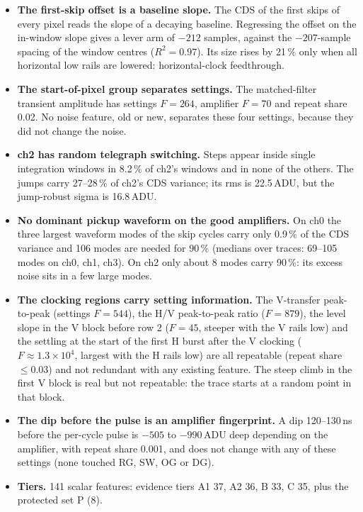 \documentclass[10pt]{article}
\begin{document}
\begin{itemize}
  \item \textbf{The first-skip offset is a baseline slope.} The CDS of the first skips of every pixel reads the slope of a
        decaying baseline. Regressing the offset on the in-window slope gives a lever arm of $-212$ samples, against the
        $-207$-sample spacing of the window centres ($R^2 = 0.97$). Its size rises by 21\,\% only when all horizontal
        low rails are lowered: horizontal-clock feedthrough.
  \item \textbf{The start-of-pixel group separates settings.} The matched-filter transient amplitude has settings
        $F = 264$, amplifier $F = 70$ and repeat share 0.02. No noise feature, old or new, separates these four
        settings, because they did not change the noise.
  \item \textbf{ch2 has random telegraph switching.} Steps appear inside single integration windows in 8.2\,\% of ch2's
        windows and in none of the others. The jumps carry 27--28\,\% of ch2's CDS variance; its rms is 22.5\,ADU,
        but the jump-robust sigma is 16.8\,ADU.
  \item \textbf{No dominant pickup waveform on the good amplifiers.} On ch0 the three largest waveform modes of the skip
        cycles carry only 0.9\,\% of the CDS variance and 106 modes are needed for 90\,\% (medians over traces: 69--105
        modes on ch0, ch1, ch3). On ch2 only about 8 modes carry 90\,\%: its excess noise sits in a few large modes.
  \item \textbf{The clocking regions carry setting information.} The V-transfer peak-to-peak (settings $F = 544$), the
        H/V peak-to-peak ratio ($F = 879$), the level slope in the V block before row 2 ($F = 45$, steeper with the V
        rails low) and the settling at the start of the first H burst after the V clocking ($F \approx 1.3\times10^4$, largest with the H rails low)
        are all repeatable (repeat share $\le 0.03$) and not redundant with any existing feature. The steep climb in
        the first V block is real but not repeatable: the trace starts at a random point in that block.
  \item \textbf{The dip before the pulse is an amplifier fingerprint.} A dip 120--130\,ns before the per-cycle pulse is
        $-505$ to $-990$\,ADU deep depending on the amplifier, with repeat share 0.001, and does not change with any of
        these settings (none touched RG, SW, OG or DG).
  \item \textbf{Tiers.} 141 scalar features: evidence tiers A1 37, A2 36, B 33, C 35, plus the protected set P (8).

\end{itemize}
\end{document}
